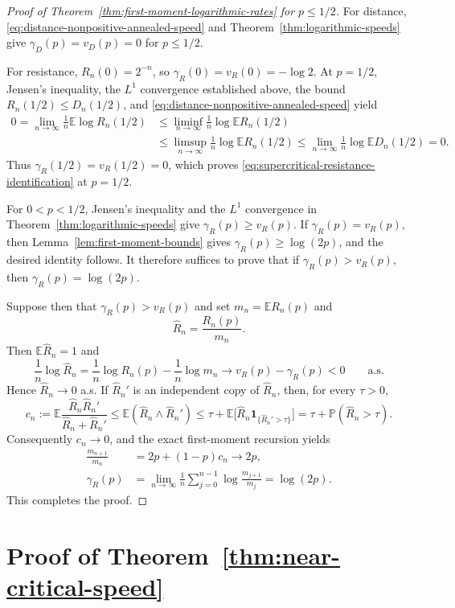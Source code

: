 \documentclass[12pt,preprint]{amsart}
\numberwithin{equation}{section}
\theoremstyle{plain}
\theoremstyle{definition}
\newcommand{\E}{\mathbb E}
\newcommand{\Pp}{\mathbb P}
\newcommand{\ind}{\mathbf 1}
\begin{document}
\begin{proof}[Proof of Theorem~\ref{thm:first-moment-logarithmic-rates}
for $p\le 1/2$]
For distance, \eqref{eq:distance-nonpositive-annealed-speed} and
Theorem~\ref{thm:logarithmic-speeds} give
$\gamma_D(p)=v_D(p)=0$ for $p\le1/2$.

For resistance, $R_n(0)=2^{-n}$, so
$\gamma_R(0)=v_R(0)=-\log2$.  At $p=1/2$,
Jensen's inequality, the $L^1$ convergence established above,
the bound $R_n(1/2)\le D_n(1/2)$, and
\eqref{eq:distance-nonpositive-annealed-speed} yield
\[
\begin{aligned}
 0
 =\lim_{n\to\infty}\frac1n\E\log R_n(1/2)
 &\le\liminf_{n\to\infty}\frac1n\log\E R_n(1/2)\\
 &\le\limsup_{n\to\infty}\frac1n\log\E R_n(1/2)
 \le\lim_{n\to\infty}\frac1n\log\E D_n(1/2)=0.
\end{aligned}
\]
Thus $\gamma_R(1/2)=v_R(1/2)=0$, which proves
\eqref{eq:supercritical-resistance-identification} at $p=1/2$.

For $0<p<1/2$, Jensen's inequality and the $L^1$ convergence in
Theorem~\ref{thm:logarithmic-speeds} give $\gamma_R(p)\ge v_R(p)$.
If $\gamma_R(p)=v_R(p)$, then Lemma~\ref{lem:first-moment-bounds} gives
$\gamma_R(p)\ge\log(2p)$, and the desired identity follows.  It therefore
suffices to prove that if $\gamma_R(p)>v_R(p)$, then
$\gamma_R(p)=\log(2p)$.

Suppose then that $\gamma_R(p)>v_R(p)$ and set
$m_n=\E R_n(p)$ and
\[
 \widehat R_n=\frac{R_n(p)}{m_n}.
\]
Then $\E\widehat R_n=1$ and
\[
 \frac1n\log\widehat R_n
 =\frac1n\log R_n(p)-\frac1n\log m_n
 \longrightarrow v_R(p)-\gamma_R(p)<0
 \qquad\text{a.s.}
\]
Hence $\widehat R_n\to0$ a.s.  If $\widehat R_n'$ is an independent copy of
$\widehat R_n$, then, for every $\tau>0$,
\[
 c_n:=\E\frac{\widehat R_n\widehat R_n'}
                    {\widehat R_n+\widehat R_n'}
 \le \E(\widehat R_n\wedge\widehat R_n')
 \le \tau+\E\bigl[\widehat R_n
                   \ind_{\{\widehat R_n'>\tau\}}\bigr]
 =\tau+\Pp(\widehat R_n>\tau).
\]
Consequently $c_n\to0$, and the exact first-moment recursion yields
\[
\begin{aligned}
 \frac{m_{n+1}}{m_n}
 &=2p+(1-p)c_n\longrightarrow2p,\\
 \gamma_R(p)
 &=\lim_{n\to\infty}\frac1n
   \sum_{j=0}^{n-1}\log\frac{m_{j+1}}{m_j}
 =\log(2p).
\end{aligned}
\]
This completes the proof.
\end{proof}

\section{Proof of Theorem~\ref{thm:near-critical-speed}}
\label{sec:two-sided-barriers}
\end{document}
